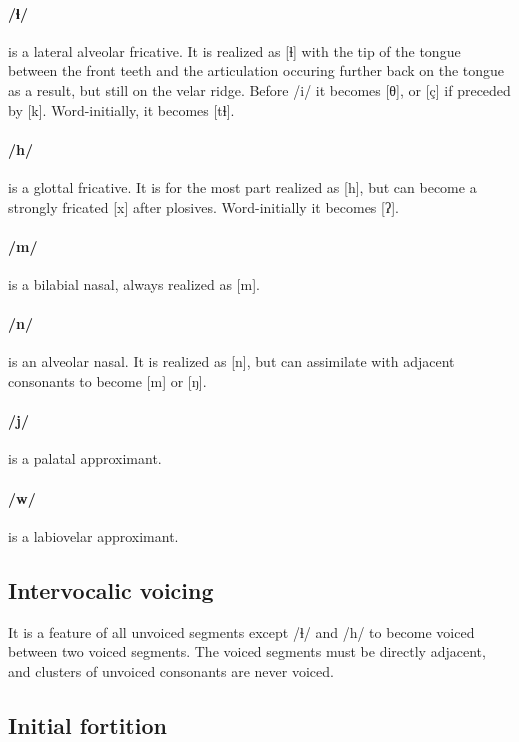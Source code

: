 \documentclass[smallroyalvopaper,9pt]{memoir}
\newcommand{\bind}{\symbol{"0361}}
\begin{document}
\paragraph{/ɬ/} is a lateral alveolar fricative. It is realized as [ɬ] with the tip of the tongue between the front teeth and the articulation occuring further back on the tongue as a result, but still on the velar ridge. Before /i/ it becomes [θ], or [ç] if preceded by [k]. Word-initially, it becomes [t\bind{}ɬ].

\paragraph{/h/} is a glottal fricative. It is for the most part realized as [h], but can become a strongly fricated [x] after plosives. Word-initially it becomes [ʔ].

\paragraph{/m/} is a bilabial nasal, always realized as [m].

\paragraph{/n/} is an alveolar nasal. It is realized as [n], but can assimilate with adjacent consonants to become [m] or [ŋ]. 

\paragraph{/j/} is a palatal approximant. 

\paragraph{/w/} is a labiovelar approximant.

\subsection{Intervocalic voicing} \label{intervocalic}

It is a feature of all unvoiced segments except /ɬ/ and /h/ to become voiced between two voiced segments. The voiced segments must be directly adjacent, and clusters of unvoiced consonants are never voiced.


\subsection{Initial fortition} \label{initfort}
\end{document}
